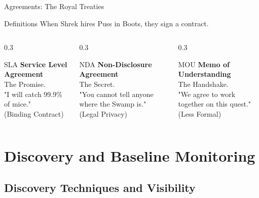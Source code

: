 \documentclass[aspectratio=169]{beamer}  %
\begin{document}
\begin{frame}{Agreements: The Royal Treaties}
    \begin{block}{Definitions}
        \footnotesize
        When Shrek hires Puss in Boots, they sign a contract.
    \end{block}
    \vspace{0.5cm}
    \begin{columns}[T]
        \begin{column}{0.3\textwidth}
            \begin{block}{SLA}
                \tiny \textbf{Service Level Agreement}\\
                The Promise.\\
                "I will catch 99.9\% of mice."\\
                (Binding Contract)
            \end{block}
        \end{column}
        \begin{column}{0.3\textwidth}
            \begin{block}{NDA}
                \tiny \textbf{Non-Disclosure Agreement}\\
                The Secret.\\
                "You cannot tell anyone where the Swamp is."\\
                (Legal Privacy)
            \end{block}
        \end{column}
        \begin{column}{0.3\textwidth}
            \begin{block}{MOU}
                \tiny \textbf{Memo of Understanding}\\
                The Handshake.\\
                "We agree to work together on this quest."\\
                (Less Formal)
            \end{block}
        \end{column}
    \end{columns}
\end{frame}

\section{Discovery and Baseline Monitoring}
\subsection{Discovery Techniques and Visibility}
\end{document}
